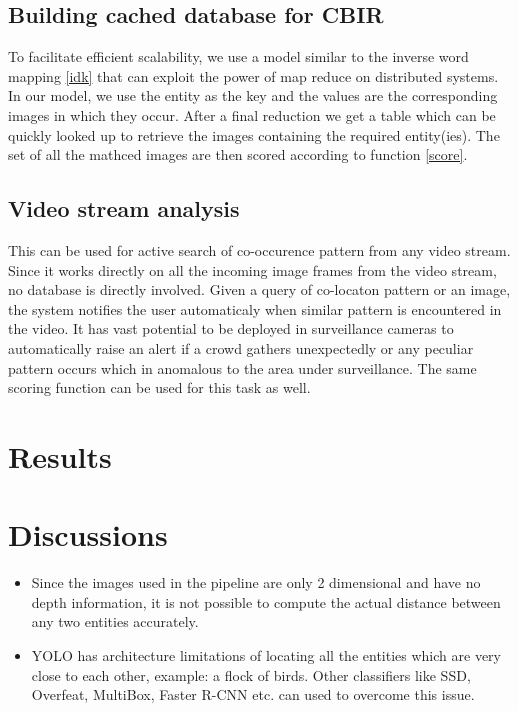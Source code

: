 \documentclass[conference]{IEEEtran}
\begin{document}
    \subsection{Building cached database for CBIR}
    To facilitate efficient scalability, we use a model similar to the inverse word mapping \ref{idk} that can exploit the power of map reduce on distributed systems. In our model, we use the entity as the key and the values are the corresponding images in which they occur. After a final reduction we get a table which can be quickly looked up to retrieve the images containing the required entity(ies). The set of all the mathced images are then scored according to function \ref{score}. 

    \subsection{Video stream analysis}
    This can be used for active search of co-occurence pattern from any video stream. Since it works directly on all the incoming image frames from the video stream, no database is directly involved. Given a query of co-locaton pattern or an image, the system notifies the user automaticaly when similar pattern is encountered in the video. It has vast potential to be deployed in surveillance cameras to automatically raise an alert if a crowd gathers unexpectedly or any peculiar pattern occurs which in anomalous to the area under surveillance. The same scoring function can be used for this task as well.

\section{Results}


\section{Discussions}
    \begin{itemize}
        \item Since the images used in the pipeline are only 2 dimensional and have no depth information, it is not possible to compute the actual distance between any two entities accurately.
        \item YOLO has architecture limitations of locating all the entities which are very close to each other, example: a flock of birds. Other classifiers like SSD, Overfeat, MultiBox, Faster R-CNN etc. can  used to overcome this issue.
    \end{itemize}
\end{document}
